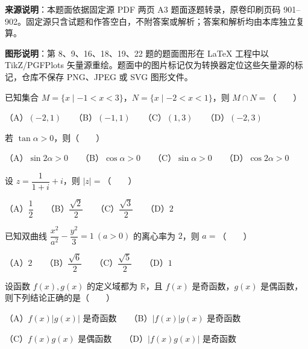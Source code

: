 


\begin{gktip}
\textbf{来源说明}：本题面依据固定源 PDF 两页 A3 题面逐题转录，原卷印刷页码 901–902。固定源只含试题和作答空白，不附答案或解析；答案和解析均由本库独立复算。

\textbf{图形说明}：第 8、9、16、18、19、22 题的题面图形在 LaTeX 工程中以 TikZ/PGFPlots 矢量源重绘。题面中的图片标记仅为转换器定位这些矢量源的标记，仓库不保存 PNG、JPEG 或 SVG 图形文件。
\end{gktip}


\begin{question}
已知集合 $M=\{x\mid -1<x<3\}$，$N=\{x\mid -2<x<1\}$，则 $M\cap N=$\mbox{（　　）}

（A）$(-2,1)$　　（B）$(-1,1)$　　（C）$(1,3)$　　（D）$(-2,3)$

\end{question}
\begin{question}
若 $\tan\alpha>0$，则\mbox{（　　）}

（A）$\sin2\alpha>0$　　（B）$\cos\alpha>0$　　（C）$\sin\alpha>0$　　（D）$\cos2\alpha>0$

\end{question}
\begin{question}
设 $z=\dfrac1{1+i}+i$，则 $|z|=$\mbox{（　　）}

（A）$\dfrac12$　　（B）$\dfrac{\sqrt2}{2}$　　（C）$\dfrac{\sqrt3}{2}$　　（D）$2$

\end{question}
\begin{question}
已知双曲线 $\dfrac{x^2}{a^2}-\dfrac{y^2}{3}=1\ (a>0)$ 的离心率为 $2$，则 $a=$\mbox{（　　）}

（A）$2$　　（B）$\dfrac{\sqrt6}{2}$　　（C）$\dfrac{\sqrt5}{2}$　　（D）$1$

\end{question}
\begin{question}
设函数 $f(x),g(x)$ 的定义域都为 $\mathbb R$，且 $f(x)$ 是奇函数，$g(x)$ 是偶函数，则下列结论正确的是\mbox{（　　）}

（A）$f(x)|g(x)|$ 是奇函数　　（B）$|f(x)|g(x)$ 是奇函数

（C）$f(x)g(x)$ 是偶函数　　（D）$|f(x)g(x)|$ 是奇函数

\end{question}
